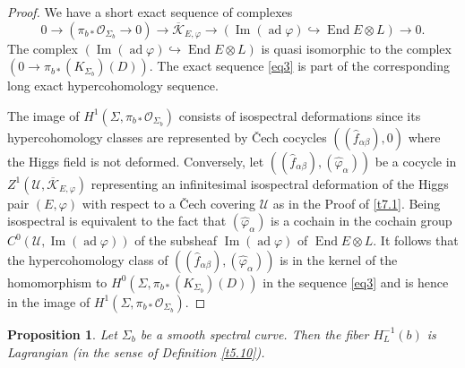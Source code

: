 \documentclass[12pt,a4paper,oneside,english]{smfart}
\newtheorem{prop}[thm]{Proposition}
\theoremstyle{definition}
\theoremstyle{remark}
\DeclareMathOperator{\End}{End}
\DeclareMathOperator{\ad}{ad}
\DeclareMathOperator{\image}{Im}
\newcommand{\cO}{\mathcal{O}}
\newcommand{\KK}{\mathscr{K}}
\begin{document}
\begin{proof}
We have a short exact sequence of complexes
\[
0 \to (\pi_{b*}\cO_{\Sigma_b} \to 0) \to \overline{\KK}_{E, \varphi} \to (\image(\ad \varphi) \hookrightarrow \End E \otimes L) \to 0.
\]
The complex $(\image(\ad \varphi) \hookrightarrow \End E \otimes L)$ is quasi isomorphic to the complex $(0 \to \pi_{b*}(K_{\Sigma_b})(D))$. The exact sequence \eqref{eq3} is part of the corresponding long exact hypercohomology sequence.

The image of $H^1(\Sigma, \pi_{b*}\cO_{\Sigma_b})$ consists of isospectral deformations since its hypercohomology classes are represented by \v{C}ech cocycles $((\hat{f}_{\alpha \beta}), 0)$ where the Higgs field is not deformed. Conversely, let $((\hat{f}_{\alpha \beta}), (\hat{\varphi}_\alpha))$ be a cocycle in $Z^1(\mathcal{U}, \overline{\KK}_{E, \varphi})$ representing an infinitesimal isospectral deformation of the Higgs pair $(E, \varphi)$ with respect to a \v{C}ech covering $\mathcal{U}$ as in the Proof of \ref{t7.1}. Being isospectral is equivalent to the fact that $(\hat{\varphi}_\alpha)$ is a cochain in the cochain group $C^0(\mathcal{U}, \image(\ad \varphi))$ of the subsheaf $\image(\ad \varphi)$ of $\End E \otimes L$. It follows that the hypercohomology class of $((\hat{f}_{\alpha \beta}), (\hat{\varphi}_\alpha))$ is in the kernel of the homomorphism to $H^0(\Sigma, \pi_{b*}(K_{\Sigma_b})(D))$ in the sequence \eqref{eq3} and is hence in the image of $H^1(\Sigma, \pi_{b*}\cO_{\Sigma_b})$.
\end{proof}

\begin{prop}\label{t8.3}
Let $\Sigma_b$ be a smooth spectral curve. Then the fiber $H_L^{-1}(b)$ is Lagrangian (in the sense of Definition \ref{t5.10}).
\end{prop}
\end{document}
